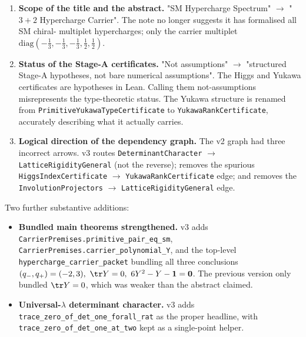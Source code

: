 \begin{enumerate}[leftmargin=1.6em, itemsep=3pt]
\item \textbf{Scope of the title and the abstract.} "SM
    Hypercharge Spectrum" $\to$ "$3+2$ Hypercharge Carrier". The
    note no longer suggests it has formalised all SM chiral-
    multiplet hypercharges; only the carrier multiplet
    $\mathrm{diag}(-\tfrac13,-\tfrac13,-\tfrac13,\tfrac12,\tfrac12)$.
\item \textbf{Status of the Stage-A certificates.} "Not
    assumptions" $\to$ "structured Stage-A hypotheses, not bare
    numerical assumptions". The Higgs and Yukawa certificates
    are hypotheses in Lean. Calling them not-assumptions
    misrepresents the type-theoretic status. The Yukawa
    structure is renamed from \texttt{PrimitiveYukawaTypeCertificate}
    to \texttt{YukawaRankCertificate}, accurately describing what
    it actually carries.
\item \textbf{Logical direction of the dependency graph.} The v2
    graph had three incorrect arrows. v3 routes
    \texttt{DeterminantCharacter} $\to$
    \texttt{LatticeRigidityGeneral} (not the reverse); removes
    the spurious \texttt{HiggsIndexCertificate} $\to$
    \texttt{YukawaRankCertificate} edge; and removes the
    \texttt{InvolutionProjectors} $\to$
    \texttt{LatticeRigidityGeneral} edge.
\end{enumerate}

Two further substantive additions:

\begin{itemize}[leftmargin=1.6em, itemsep=1pt]
\item \textbf{Bundled main theorems strengthened.} v3 adds
    \texttt{CarrierPremises.primitive\_pair\_eq\_sm},
    \texttt{CarrierPremises.carrier\_polynomial\_Y}, and the
    top-level \texttt{hypercharge\_carrier\_packet} bundling all
    three conclusions $(q_-,q_+)=(-2,3),\ \tr Y=0,\
    6 Y^2 - Y - \mathbf 1 = \mathbf 0$. The previous version only
    bundled $\tr Y = 0$, which was weaker than the abstract
    claimed.
\item \textbf{Universal-$\lambda$ determinant character.} v3 adds
    \texttt{trace\_zero\_of\_det\_one\_forall\_rat} as the proper
    headline, with \texttt{trace\_zero\_of\_det\_one\_at\_two} kept
    as a single-point helper.
\end{itemize}

